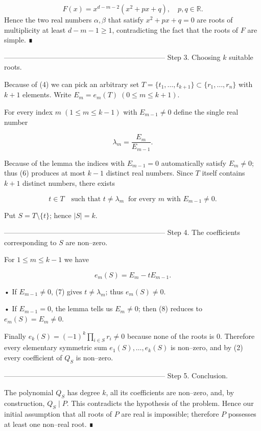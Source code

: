 \[
F(x)=x^{d-m-2}(x^2+px+q),\quad p,q\in\mathbb R.
\]
Hence the two real numbers \(\alpha ,\beta\) that satisfy
\(x^2+px+q=0\) are roots of multiplicity at least \(d-m-1\ge 1\),
contradicting the fact that the roots of \(F\)
are simple. ∎

--------------------------------------------------------------------
Step 3.  Choosing \(k\) suitable roots.

Because of (4) we can pick an arbitrary set  
\(T=\{t_1,\dots ,t_{k+1}\}\subset\{r_1,\dots ,r_n\}\) with \(k+1\) elements.
Write \(E_m=e_m(T)\;(0\le m\le k+1)\).

For every index \(m\;(1\le m\le k-1)\) with \(E_{m-1}\neq 0\) define the single
real number  

\[
\lambda_m=\frac{E_m}{E_{m-1}} .
\tag{6}
\]

Because of the lemma the indices with \(E_{m-1}=0\) automatically satisfy
\(E_m\neq 0\); thus (6) produces at most \(k-1\) distinct real numbers.
Since \(T\) itself contains \(k+1\) distinct numbers, there exists  

\[
t\in T\quad\text{such that }t\neq\lambda_m\ \text{ for every }m\text{ with }E_{m-1}\neq 0.
\tag{7}
\]

Put \(S=T\setminus\{t\}\); hence \(|S|=k\).

--------------------------------------------------------------------
Step 4.  The coefficients corresponding to \(S\) are non–zero.

For \(1\le m\le k-1\) we have  

\[
e_m(S)=E_m-tE_{m-1}.
\tag{8}
\]

•  If \(E_{m-1}\neq 0\), (7) gives \(t\neq\lambda_m\); thus \(e_m(S)\neq 0\).

•  If \(E_{m-1}=0\), the lemma tells us \(E_m\neq 0\); then (8) reduces to
\(e_m(S)=E_m\neq 0\).

Finally \(e_k(S)=(-1)^k\!\!\!\!\prod_{i\in S}\!\!r_i\neq 0\) because none of the
roots is \(0\).
Therefore every elementary symmetric sum
\(e_1(S),\dots ,e_k(S)\) is non–zero, and by (2) every
coefficient of \(Q_S\) is non–zero.

--------------------------------------------------------------------
Step 5.  Conclusion.

The polynomial \(Q_S\) has degree \(k\), all its coefficients are non–zero,
and, by construction, \(Q_S\mid P\).  
This contradicts the hypothesis of the problem.
Hence our initial assumption that all roots of \(P\) are real is impossible;  
therefore \(P\) possesses at least one non–real root. ∎